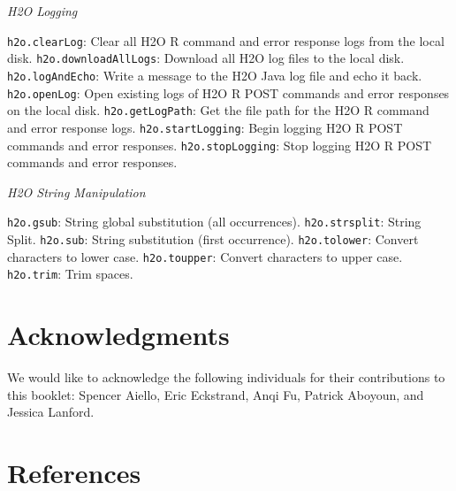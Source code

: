 {{\medskip
\emph{H2O Logging}\par
{\texttt{h2o.clearLog}}: Clear all H2O R command and error response logs from the local disk.
{\texttt{h2o.downloadAllLogs}}: Download all H2O log files to the local disk.
{\texttt{h2o.logAndEcho}}: Write a message to the H2O Java log file and echo it back.
{\texttt{h2o.openLog}}: Open existing logs of H2O R POST commands and error responses on the local disk.
{\texttt{h2o.getLogPath}}: Get the file path for the H2O R command and error response logs.
{\texttt{h2o.startLogging}}: Begin logging H2O R POST commands and error responses.
{\texttt{h2o.stopLogging}}: Stop logging H2O R POST commands and error responses.

\medskip
\emph{H2O String Manipulation}\par
{\texttt{h2o.gsub}}: String global substitution (all occurrences).
{\texttt{h2o.strsplit}}: String Split.
{\texttt{h2o.sub}}: String substitution (first occurrence).
{\texttt{h2o.tolower}}: Convert characters to lower case.
{\texttt{h2o.toupper}}: Convert characters to upper case.
{\texttt{h2o.trim}}: Trim spaces.
}



\section{Acknowledgments}
We would like to acknowledge the following individuals for their contributions to this booklet: Spencer Aiello, Eric Eckstrand, Anqi Fu, Patrick Aboyoun, and Jessica Lanford.


\newpage
\section{References}





\medskip


\medskip


\medskip


\medskip


\medskip


}
